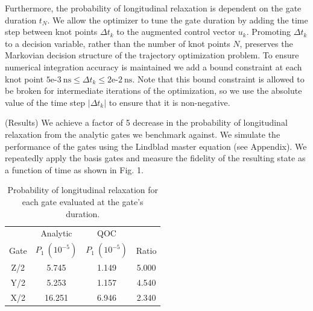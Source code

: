 \documentclass[
  amsfonts,
  amsmath,
  tbtags,
  amssymb,
  aps,
  nobibnotes,
  twocolumn,
]{revtex4-2}
\begin{document}
Furthermore, the probability of longitudinal 
relaxation is dependent on the gate duration $t_{N}$.
We allow the optimizer to tune the gate duration by
adding the time step between knot points $\Delta t_{k}$
to the augmented control vector $u_{k}$.
Promoting $\Delta t_{k}$ to a decision variable, rather
than the number of knot points $N$, preserves the
Markovian decision structure of the trajectory
optimization problem. To ensure numerical
integration accuracy is maintained we add a bound
constraint at each knot point
$5\textrm{e-}3 \ \textrm{ns} \le
\Delta t_{k} \le 2\textrm{e-}2 \ \textrm{ns}$.
Note that this bound constraint is allowed to be
broken for intermediate iterations of the optimization,
so we use the absolute value of the time step
$\lvert \Delta t_{k} \rvert$ to ensure that it is non-negative.

(Results) We achieve a factor of 5 decrease in the probability
of longitudinal relaxation from the analytic gates we benchmark
against. We simulate the performance of the gates using the
Lindblad master equation (see Appendix). We repeatedly apply the basis gates
and measure the fidelity of the resulting state as a function
of time as shown in Fig. 1.

\begin{table}[ht]
  \begin{tabular}{c | c | c | c}
    & Analytic  & QOC &\\
    Gate & $P_{1}\ (10^{-5})$ & $P_{1}\ (10^{-5})$ & Ratio\\
    \hline
    Z/2 & 5.745 & 1.149 & 5.000\\
    Y/2 & 5.253 & 1.157 & 4.540\\
    X/2 & 16.251 & 6.946 & 2.340\\
  \end{tabular}
  \caption{Probability of longitudinal relaxation for each gate
    evaluated at the gate's duration.}
\end{table}
\end{document}
